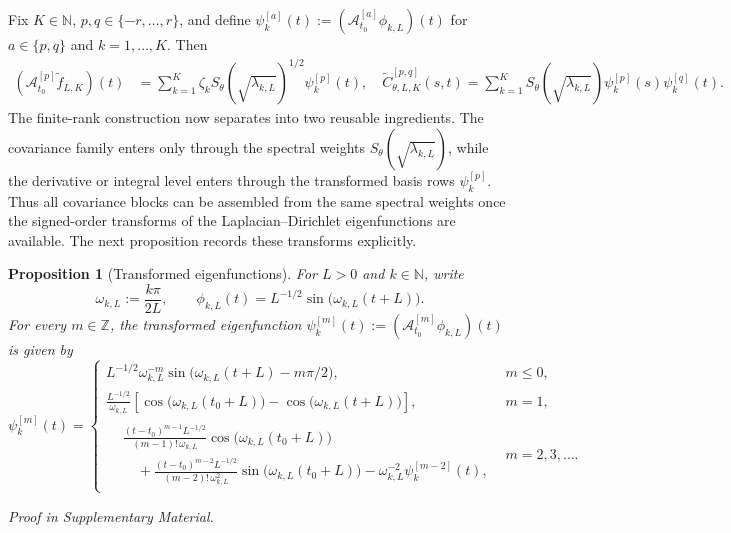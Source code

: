 \documentclass[11pt,a4paper]{article}
\newtheorem{proposition}{Proposition}
\theoremstyle{definition}
\theoremstyle{remark}
\newenvironment{mainproposition}[1][]{\begin{proposition}[#1]}{\par\noindent\emph{Proof in Supplementary Material.}\end{proposition}}
\begin{document}
Fix $K \in \mathbb N$, $p,q \in \{-r,\ldots,r\}$, and define $\psi_k^{[a]}(t):=(\mathcal A_{t_0}^{[a]}\phi_{k,L})(t)$ for $a\in\{p,q\}$ and $k=1,\ldots,K$. Then
\begin{align*}
(\mathcal A_{t_0}^{[p]} \widetilde f_{L,K})(t)
&=
\sum_{k=1}^K
\zeta_k S_\theta\left(\sqrt{\lambda_{k,L}}\right)^{1/2}\psi_k^{[p]}(t), \quad \widetilde C_{\theta,L,K}^{[p,q]}(s,t) = \sum_{k=1}^K
S_\theta\left(\sqrt{\lambda_{k,L}}\right)\psi_k^{[p]}(s)\psi_k^{[q]}(t).
\end{align*}
The finite-rank construction now separates into two reusable ingredients. The covariance family enters only through the spectral weights \(S_\theta(\sqrt{\lambda_{k,L}})\), while the derivative or integral level enters through the transformed basis rows \(\psi_k^{[p]}\). Thus all covariance blocks can be assembled from the same spectral weights once the signed-order transforms of the Laplacian--Dirichlet eigenfunctions are available. The next proposition records these transforms explicitly.

\begin{mainproposition}[Transformed eigenfunctions]\label{prop:integrals}
For \(L>0\) and \(k\in\mathbb N\), write
\[
\omega_{k,L}:=\frac{k\pi}{2L},
\qquad
\phi_{k,L}(t)=L^{-1/2}\sin\bigl(\omega_{k,L}(t+L)\bigr).
\]
For every \(m\in\mathbb Z\), the transformed eigenfunction
\(\psi_k^{[m]}(t):=(\mathcal A_{t_0}^{[m]}\phi_{k,L})(t)\) is given by
\[
\psi_k^{[m]}(t)=
\begin{cases}
L^{-1/2}\omega_{k,L}^{-m}
\sin\bigl(\omega_{k,L}(t+L)-m\pi/2\bigr),
& m\le0,\\[5pt]
\displaystyle
\frac{L^{-1/2}}{\omega_{k,L}}
\left[
\cos\bigl(\omega_{k,L}(t_0+L)\bigr)-\cos\bigl(\omega_{k,L}(t+L)\bigr)
\right],
& m=1,\\[8pt]
\begin{aligned}
&\displaystyle
\frac{(t-t_0)^{m-1}L^{-1/2}}{(m-1)!\,\omega_{k,L}}
\cos\bigl(\omega_{k,L}(t_0+L)\bigr)\\
&\displaystyle\quad+
\frac{(t-t_0)^{m-2}L^{-1/2}}{(m-2)!\,\omega_{k,L}^{2}}
\sin\bigl(\omega_{k,L}(t_0+L)\bigr)
-\omega_{k,L}^{-2}\psi_k^{[m-2]}(t),
\end{aligned}
& m=2,3,\ldots.
\end{cases}
\]
\end{mainproposition}
\end{document}
